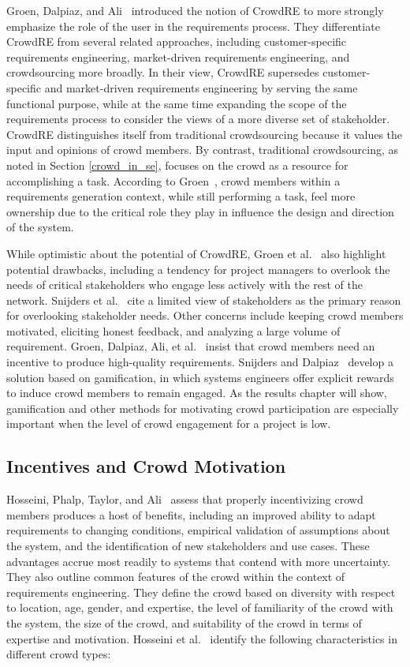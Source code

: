 Groen, Dalpiaz, and Ali~\cite{groen} introduced the notion of CrowdRE to more strongly emphasize the role of the user in the requirements process. They differentiate CrowdRE from several related approaches, including customer-specific requirements engineering, market-driven requirements engineering, and crowdsourcing more broadly. In their view, CrowdRE supersedes customer-specific and market-driven requirements engineering by serving the same functional purpose, while at the same time expanding the scope of the requirements process to consider the views of a more diverse set of stakeholder. CrowdRE distinguishes itself from traditional crowdsourcing because it values the input and opinions of crowd members. By contrast, traditional crowdsourcing, as noted in Section \ref{crowd_in_se}, focuses on the crowd as a resource for accomplishing a task. According to Groen~\cite{groen}, crowd members within a requirements generation context, while still performing a task, feel more ownership due to the critical role they play in influence the design and direction of the system.

While optimistic about the potential of CrowdRE, Groen et al.~\cite{groen} also highlight potential drawbacks, including a tendency for project managers to overlook the needs of critical stakeholders who engage less actively with the rest of the network. Snijders et al.~\cite{snijders, snijders2} cite a limited view of stakeholders as the primary reason for overlooking stakeholder needs. Other concerns include keeping crowd members motivated, eliciting honest feedback, and analyzing a large volume of requirement. Groen, Dalpiaz, Ali,  et al.~\cite{groen} insist that crowd members need an incentive to produce high-quality requirements. Snijders and Dalpiaz~\cite{snijders, snijders2} develop a solution based on gamification, in which systems engineers offer explicit rewards to induce crowd members to remain engaged. As the results chapter will show, gamification and other methods for motivating crowd participation are especially important when the level of crowd engagement for a project is low.

\subsection{Incentives and Crowd Motivation}

Hosseini, Phalp, Taylor, and Ali~\cite{hosseini} assess that properly incentivizing crowd members produces a host of benefits, including an improved ability to adapt requirements to changing conditions, empirical validation of assumptions about the system, and the identification of new stakeholders and use cases. These advantages accrue most readily to systems that contend with more uncertainty. They also outline common features of the crowd within the context of requirements engineering. They define the crowd based on diversity with respect to location, age, gender, and expertise, the level of familiarity of the crowd with the system, the size of the crowd, and suitability of the crowd in terms of expertise and motivation. Hosseini et al.~\cite{hosseini} identify the following characteristics in different crowd types:

